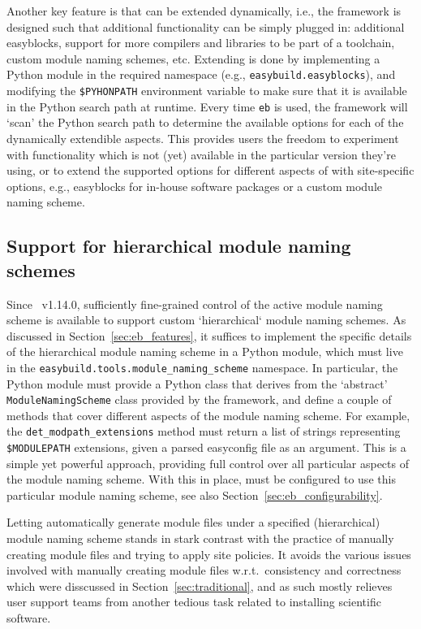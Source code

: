 Another key feature is that \easybuild{} can be extended dynamically, i.e., the
framework is designed such that additional functionality can be simply plugged in:
additional easyblocks, support for more compilers and libraries to be part
of a toolchain, custom module naming schemes, etc. Extending \easybuild{} is done by
implementing a Python module in the required namespace (e.g.,
\texttt{\small easybuild.easyblocks}), and modifying the \texttt{\small \$PYHONPATH} 
environment variable to make sure that it is available in the Python search path at
runtime. Every time \texttt{\small eb} is used, the framework will `scan' the Python 
search path to determine the available options for each of the dynamically 
extendible aspects. This provides \easybuild{} users the freedom to experiment with
functionality which is not (yet) available in the particular version they're using,
or to extend the supported options for different aspects of \easybuild{} with
site-specific options, e.g., easyblocks for in-house software packages or a custom
module naming scheme.

\subsection{Support for hierarchical module naming schemes}

Since \easybuild{}~v1.14.0, sufficiently fine-grained control of the active module
naming scheme is available to support custom `hierarchical`
module naming schemes. As discussed in Section~\ref{sec:eb_features}, it suffices to
implement the specific details of the hierarchical module naming scheme in a Python
module, which must live in the \texttt{\small easybuild.tools.module\_naming\_scheme}
namespace. In particular, the Python module must provide a Python class that derives
from the `abstract' \texttt{\small ModuleNamingScheme} class provided by the
\easybuild{} framework, and define a couple of methods that cover different aspects
of the module naming scheme. For example, the
\texttt{\small det\_modpath\_extensions} method must return a list of strings
representing \texttt{\small \$MODULEPATH} extensions, given a
parsed easyconfig file as an argument. This is a simple yet powerful approach,
providing full control over all particular aspects of the module naming scheme.
With this in place, \easybuild{} must be configured to use this particular module
naming scheme, see also Section~\ref{sec:eb_configurability}.

Letting \easybuild{} automatically generate module files under a specified
(hierarchical) module naming scheme stands in stark contrast with the practice of
manually creating module files and trying to apply site policies. It avoids the
various issues involved with manually creating module files w.r.t.\ consistency and
correctness which were disscussed in Section~\ref{sec:traditional}, and as such
mostly relieves user support teams from another tedious task related to installing
scientific software.

